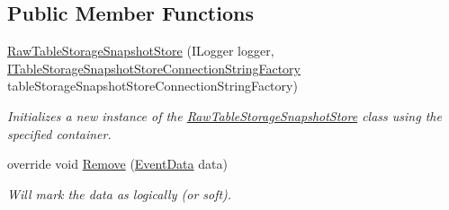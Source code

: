 \subsection*{Public Member Functions}
\begin{DoxyCompactItemize}
\item 
\hyperlink{classCqrs_1_1Azure_1_1BlobStorage_1_1Events_1_1TableStorageSnapshotStore_1_1RawTableStorageSnapshotStore_a19d6dadf022ad205c9bf6e380f4da06e_a19d6dadf022ad205c9bf6e380f4da06e}{Raw\+Table\+Storage\+Snapshot\+Store} (I\+Logger logger, \hyperlink{interfaceCqrs_1_1Azure_1_1BlobStorage_1_1ITableStorageSnapshotStoreConnectionStringFactory}{I\+Table\+Storage\+Snapshot\+Store\+Connection\+String\+Factory} table\+Storage\+Snapshot\+Store\+Connection\+String\+Factory)
\begin{DoxyCompactList}\small\item\em Initializes a new instance of the \hyperlink{classCqrs_1_1Azure_1_1BlobStorage_1_1Events_1_1TableStorageSnapshotStore_1_1RawTableStorageSnapshotStore}{Raw\+Table\+Storage\+Snapshot\+Store} class using the specified container. \end{DoxyCompactList}\item 
override void \hyperlink{classCqrs_1_1Azure_1_1BlobStorage_1_1Events_1_1TableStorageSnapshotStore_1_1RawTableStorageSnapshotStore_a3f0c5381b2169d014d5e9c0e1b00e43d_a3f0c5381b2169d014d5e9c0e1b00e43d}{Remove} (\hyperlink{classCqrs_1_1Events_1_1EventData}{Event\+Data} data)
\begin{DoxyCompactList}\small\item\em Will mark the {\itshape data}  as logically (or soft). \end{DoxyCompactList}\end{DoxyCompactItemize}
